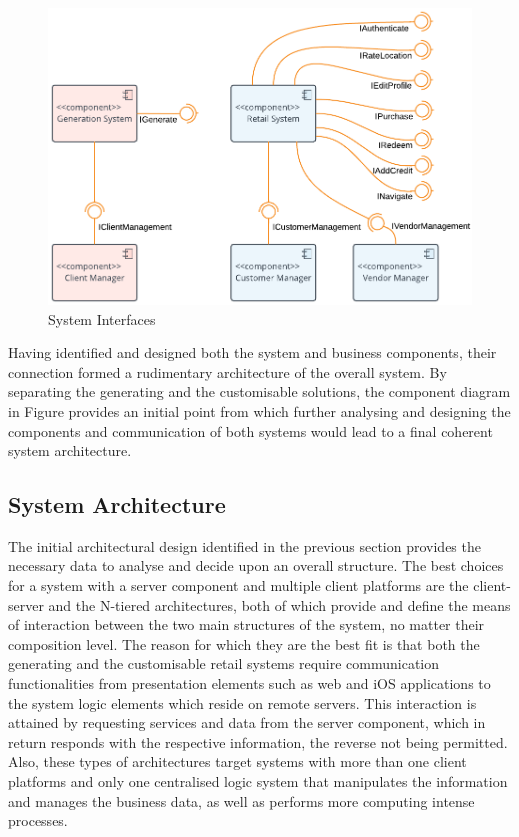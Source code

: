 \begin{figure}[!ht]
\centering
\includegraphics[scale=0.31]{img/Initial_Architecture.png}
\caption{System Interfaces}
\label{fig:initial_architecture}
\end{figure}

Having identified and designed both the system and business components, their connection formed a rudimentary architecture of the overall system. By separating the generating and the customisable solutions, the component diagram in Figure provides an initial point from which further analysing and designing the components and communication of both systems would lead to a final coherent system architecture.

\subsection{System Architecture}

The initial architectural design identified in the previous section provides the necessary data to analyse and decide upon an overall structure. The best choices for a system with a server component and multiple client platforms are the client-server and the N-tiered architectures, both of which provide and define the means of interaction between the two main structures of the system, no matter their composition level. The reason for which they are the best fit is that both the generating and the customisable retail systems require communication functionalities from presentation elements such as web and iOS applications to the system logic elements which reside on remote servers. This interaction is attained by requesting services and data from the server component, which in return responds with the respective information, the reverse not being permitted. Also, these types of architectures target systems with more than one client platforms and only one centralised logic system that manipulates the information and manages the business data, as well as performs more computing intense processes.\\

